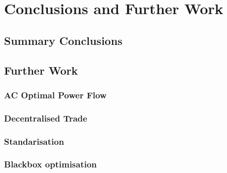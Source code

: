 \chapter{Conclusions and Further Work}
\label{ch:conclusion}

\section{Summary Conclusions}

\section{Further Work}
\label{sec:furtherwork}
%
%

\subsection{AC Optimal Power Flow}
\subsection{Decentralised Trade}
\subsection{Standarisation}
\subsection{Blackbox optimisation}
